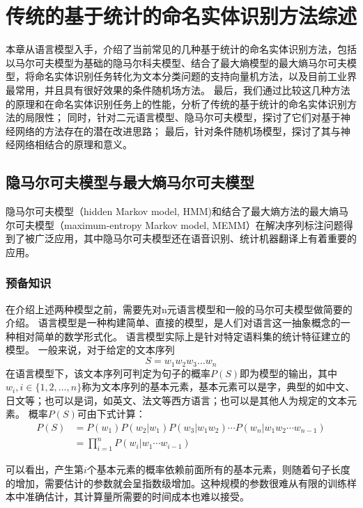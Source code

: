 \chapter{传统的基于统计的命名实体识别方法综述}
本章从语言模型入手，介绍了当前常见的几种基于统计的命名实体识别方法，包括以马尔可夫模型为基础的隐马尔科夫模型、结合了最大熵模型的最大熵马尔可夫模型，将命名实体识别任务转化为文本分类问题的支持向量机方法，以及目前工业界最常用，并且具有很好效果的条件随机场方法。
最后，我们通过比较这几种方法的原理和在命名实体识别任务上的性能，分析了传统的基于统计的命名实体识别方法的局限性；
同时，针对二元语言模型、隐马尔可夫模型，探讨了它们对基于神经网络的方法存在的潜在改进思路；
最后，针对条件随机场模型，探讨了其与神经网络相结合的原理和意义。
\section{隐马尔可夫模型与最大熵马尔可夫模型}
隐马尔可夫模型（hidden Markov model, HMM)和结合了最大熵方法的最大熵马尔可夫模型（maximum-entropy Markov model, MEMM）在解决序列标注问题得到了被广泛应用，其中隐马尔可夫模型还在语音识别、统计机器翻译上有着重要的应用。
\subsection{预备知识}
在介绍上述两种模型之前，需要先对n元语言模型和一般的马尔可夫模型做简要的介绍。
语言模型是一种构建简单、直接的模型，是人们对语言这一抽象概念的一种相对简单的数学形式化。
语言模型实际上是针对特定语料集的统计特征建立的模型。
一般来说，对于给定的文本序列
\begin{equation}
    S = w_1 w_2 w_3 \dots w_n
\end{equation}
在语言模型下，该文本序列可判定为句子的概率$P(S)$即为模型的输出，其中$w_i, i\in \{1,2,\dots,n\}$称为文本序列的基本元素，基本元素可以是字，典型的如中文、日文等；也可以是词，如英文、法文等西方语言；也可以是其他人为规定的文本元素。
概率$P(S)$可由下式计算：
\begin{align}
    P(S) &= P(w_1)P(w_2 | w_1)P(w_3 | w_1 w_2)\cdots P(w_n | w_1 w_2 \cdots w_{n-1})\\
    &= \prod_{i=1}^{n}P(w_i | w_1 \cdots w_{i-1})
    \label{eq:n-gram}
\end{align}

可以看出，产生第$i$个基本元素的概率依赖前面所有的基本元素，则随着句子长度的增加，需要估计的参数就会呈指数级增加。这种规模的参数很难从有限的训练样本中准确估计，其计算量所需要的时间成本也难以接受。

